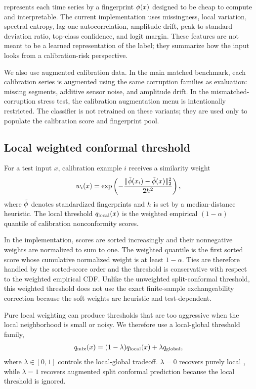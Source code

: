 \fastcp{} represents each time series by a fingerprint $\phi(x)$ designed to be cheap to compute and interpretable. The current implementation uses missingness, local variation, spectral entropy, lag-one autocorrelation, amplitude drift, peak-to-standard-deviation ratio, top-class confidence, and logit margin. These features are not meant to be a learned representation of the label; they summarize how the input looks from a calibration-risk perspective.

We also use augmented calibration data. In the main matched benchmark, each calibration series is augmented using the same corruption families as evaluation: missing segments, additive sensor noise, and amplitude drift. In the mismatched-corruption stress test, the calibration augmentation menu is intentionally restricted. The classifier is not retrained on these variants; they are used only to populate the calibration score and fingerprint pool.

\subsection{Local weighted conformal threshold}

For a test input $x$, calibration example $i$ receives a similarity weight
\begin{equation}
    w_i(x) = \exp\left(-\frac{\|\tilde{\phi}(x_i)-\tilde{\phi}(x)\|_2^2}{2h^2}\right),
\end{equation}
where $\tilde{\phi}$ denotes standardized fingerprints and $h$ is set by a median-distance heuristic. The local threshold $q_{\mathrm{local}}(x)$ is the weighted empirical $(1-\alpha)$ quantile of calibration nonconformity scores.

In the implementation, scores are sorted increasingly and their nonnegative weights are normalized to sum to one. The weighted quantile is the first sorted score whose cumulative normalized weight is at least $1-\alpha$. Ties are therefore handled by the sorted-score order and the threshold is conservative with respect to the weighted empirical CDF. Unlike the unweighted split-conformal threshold, this weighted threshold does not use the exact finite-sample exchangeability correction because the soft weights are heuristic and test-dependent.

Pure local weighting can produce thresholds that are too aggressive when the local neighborhood is small or noisy. We therefore use a local-global threshold family,
\begin{equation}
    q_{\mathrm{mix}}(x) = (1-\lambda)q_{\mathrm{local}}(x) + \lambda q_{\mathrm{global}},
\end{equation}
where $\lambda\in[0,1]$ controls the local-global tradeoff. $\lambda=0$ recovers purely local \fastcp, while $\lambda=1$ recovers augmented split conformal prediction because the local threshold is ignored.

